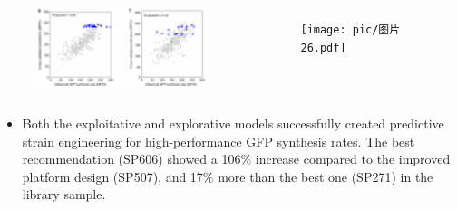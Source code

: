 \documentclass{beamer}
\begin{document}
\begin{frame}{}
		\begin{columns}
	    \begin{figure}
		\flushleft
		\includegraphics[width=6cm]{pic/图片24.pdf} 
 	    \end{figure}
	    \begin{figure}
		\flushleft
		\texttt{[image: pic/图片26.pdf]}
 	    \end{figure}
        \end{columns}
    \begin{itemize} [<+-| alert@+>] %
        \item\scriptsize Both the exploitative and explorative models successfully created predictive strain engineering for high-performance GFP synthesis rates. The best recommendation (SP606) showed a 106\% increase compared to the improved platform design (SP507), and 17\% more than the best one (SP271) in the library sample. 
        
    \end{itemize} 
        

\end{frame}
\end{document}
